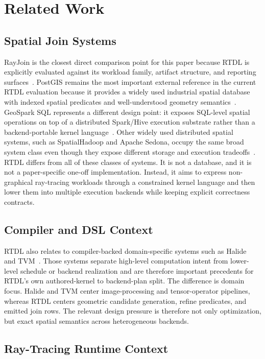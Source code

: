\documentclass[conference]{IEEEtran}
\begin{document}
\section{Related Work}

\subsection{Spatial Join Systems}

RayJoin is the closest direct comparison point for this paper because RTDL is
explicitly evaluated against its workload family, artifact structure, and
reporting surfaces~\cite{rayjoin}. PostGIS remains the most important external
reference in the current RTDL evaluation because it provides a widely used
industrial spatial database with indexed spatial predicates and well-understood
geometry semantics~\cite{postgis}. GeoSpark SQL represents a different design
point: it exposes SQL-level spatial operations on top of a distributed
Spark/Hive execution substrate rather than a backend-portable kernel
language~\cite{geosparksql}. Other widely used distributed spatial systems, such
as SpatialHadoop and Apache Sedona, occupy the same broad system class even
though they expose different storage and execution tradeoffs~\cite{spatialhadoop,sedona}.
RTDL differs from all of these classes of systems. It is
not a database, and it is not a paper-specific one-off implementation. Instead,
it aims to express non-graphical ray-tracing workloads through a constrained
kernel language and then lower them into multiple execution backends while
keeping explicit correctness contracts.

\subsection{Compiler and DSL Context}

RTDL also relates to compiler-backed domain-specific systems such as
Halide~\cite{halide} and TVM~\cite{tvm}. Those systems separate high-level
computation intent from lower-level schedule or backend realization and are
therefore important precedents for RTDL's own authored-kernel to backend-plan
split. The difference is domain focus. Halide and TVM center image-processing
and tensor-operator pipelines, whereas RTDL centers geometric candidate
generation, refine predicates, and emitted join rows. The relevant design
pressure is therefore not only optimization, but exact spatial semantics across
heterogeneous backends.

\subsection{Ray-Tracing Runtime Context}
\end{document}
